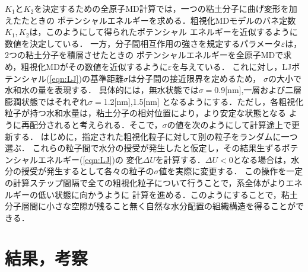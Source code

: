 ﻿\documentclass[11pt,a4j]{jarticle}
\begin{document}
$K_1$と$K_2$を決定するための全原子MD計算では，一つの粘土分子に曲げ変形を加えたたときの
ポテンシャルエネルギーを求める．粗視化MDモデルのバネ定数$K_1, K_2$は，このようにして得られたポテンシャル
エネルギーを近似するように数値を決定している．
一方，分子間相互作用の強さを規定するパラメータ$\varepsilon$は，2つの粘土分子を積層させたときの
ポテンシャルエネルギーを全原子MDで求め，粗視化MDがその数値を近似するように$\varepsilon$を与えている．
これに対し，LJポテンシャル(\ref{eqn:LJ})の基準距離$\sigma$は分子間の接近限界を定めるため，
$\sigma$の大小で水和水の量を表現する．
具体的には，無水状態では$\sigma=$0.9[nm],一層および二層膨潤状態ではそれぞれ$\sigma=$1.2[nm],1.5[nm]
となるようにする．ただし，各粗視化粒子が持つ水和水量は，粘土分子の相対位置により，より安定な状態となる
ように再配分されると考えられる．そこで，$\sigma$の値を次のようにして計算途上で更新する．
はじめに，指定された粗視化粒子に対して別の粒子をランダムに一つ選ぶ．
これらの粒子間で水分の授受が発生したと仮定し，その結果生ずるポテンシャルエネルギー(\ref{eqn:LJ})の
変化$\Delta U$を計算する．$\Delta U<0$となる場合は，水分の授受が発生するとして各々の粒子の$\sigma$値を実際に変更する．
この操作を一定の計算ステップ間隔で全ての粗視化粒子について行うことで，系全体がよりエネルギーの低い状態に向かうように
計算を進める．このようにすることで，粘土分子層間に小さな空隙が残ること無く自然な水分配置の組織構造を得ることができる．
\section{結果，考察}
\end{document}
